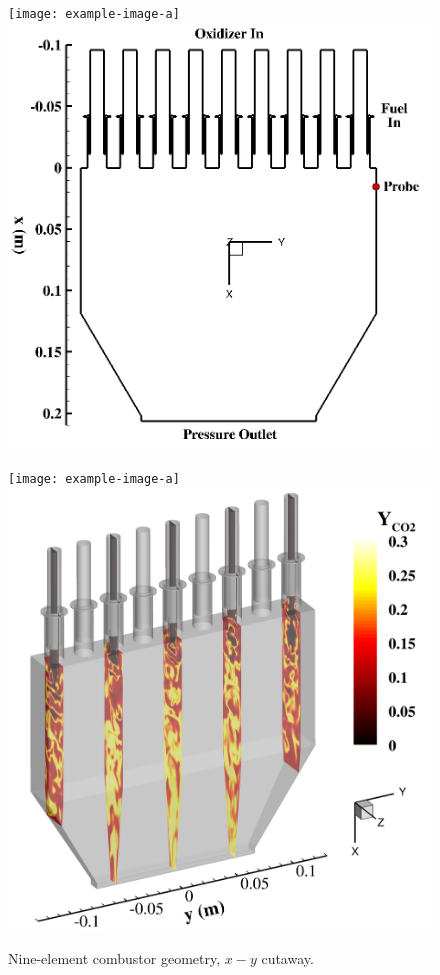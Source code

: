 \begin{figure}
	\begin{minipage}{0.49\linewidth}
		\ifdefined\DRAFT
			\texttt{[image: example-image-a]}
		\else
			\includegraphics[width=0.99\linewidth]{Chapters/NineElement/Images/geom_xy.png}
		\fi
		\caption{\label{fig:nineElemGeomXY}Nine-element combustor geometry, $x-y$ cutaway.}
	\end{minipage}
	\begin{minipage}{0.49\linewidth}
		\ifdefined\DRAFT
			\texttt{[image: example-image-a]}
		\else
			\includegraphics[width=0.99\linewidth]{Chapters/NineElement/Images/geom_iso.png}

\end{minipage}
\end{figure}
